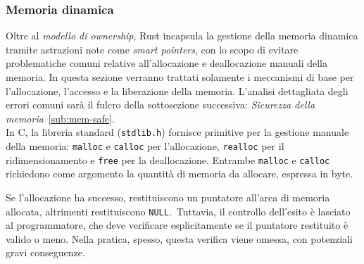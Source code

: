 \subsubsection{Memoria dinamica}
Oltre al \textit{modello di ownership}, Rust incapsula la gestione della memoria dinamica tramite astrazioni note come \textit{smart pointers}, con lo scopo
di evitare problematiche comuni relative all'allocazione e deallocazione manuali della memoria. In questa sezione 
verranno trattati solamente i meccanismi di base
per l'allocazione, 
l'accesso e la liberazione della memoria. L'analisi dettagliata degli errori comuni sarà il fulcro della sottosezione successiva: \textit{Sicurezza della memoria}~\ref{sub:mem-safe}. \hfill
\vspace{10pt}\\
\noindent In C, la libreria standard (\texttt{stdlib.h}) fornisce primitive per la gestione manuale della memoria: \texttt{malloc} e \texttt{calloc} per l'allocazione, \texttt{realloc} per il ridimensionamento e \texttt{free} per la deallocazione.
Entrambe \texttt{malloc} e \texttt{calloc} richiedono come argomento la quantità di memoria da allocare, espressa in byte. 

Se l'allocazione ha successo, restituiscono un puntatore all'area di memoria allocata, altrimenti restituiscono \texttt{NULL}.\ 
Tuttavia, il controllo dell'esito è lasciato al programmatore, che deve verificare esplicitamente se il puntatore restituito è valido o meno. 
Nella pratica, spesso, questa verifica viene omessa, con potenziali gravi conseguenze.

